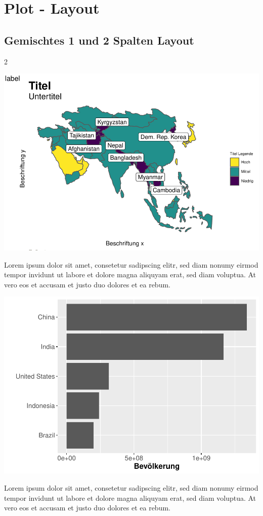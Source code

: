 \documentclass[
]{article}
\begin{document}
\newpage

\hypertarget{plot---layout}{%
\section{Plot - Layout}\label{plot---layout}}

\hypertarget{gemischtes-1-und-2-spalten-layout}{%
\subsection{Gemischtes 1 und 2 Spalten
Layout}\label{gemischtes-1-und-2-spalten-layout}}

\begin {multicols}{2}

\includegraphics{ggplot2_files/figure-latex/unnamed-chunk-7-1.pdf}

Lorem ipsum dolor sit amet, consetetur sadipscing elitr, sed diam nonumy
eirmod tempor invidunt ut labore et dolore magna aliquyam erat, sed diam
voluptua. At vero eos et accusam et justo duo dolores et ea rebum.

\columnbreak

\includegraphics{ggplot2_files/figure-latex/unnamed-chunk-8-1.pdf}

Lorem ipsum dolor sit amet, consetetur sadipscing elitr, sed diam nonumy
eirmod tempor invidunt ut labore et dolore magna aliquyam erat, sed diam
voluptua. At vero eos et accusam et justo duo dolores et ea rebum.

\end {multicols}
\end{document}
